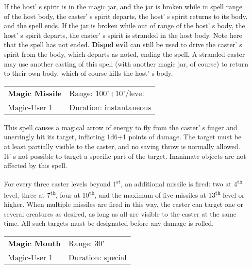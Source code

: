 \documentclass[a4paper,twoside,openany,10pt]{book}
\begin{document}
\begin{multicols}{2}
If the host' s spirit is in the magic jar, and the jar is broken while in spell range of the host body, the caster' s spirit departs, the host' s spirit returns to its body, and the spell ends. If the jar is broken while out of range of the host' s body, the host' s spirit departs, the caster' s spirit is stranded in the host body. Note here that the spell has not ended. \textbf{Dispel evil} can still be used to drive the caster' s spirit from the body, which departs as noted, ending the spell. A stranded caster may use another casting of this spell (with another magic jar, of course) to return to their own body, which of course kills the host' s body.

\smallskip\begin{flushleft} 
	\begin{tabularx}{0.45\textwidth}{@{}m{3.5cm}m{5.5cm}@{}} 
		\textbf{Magic Missile} & Range: 100'+10'/level\\
Magic-User 1 & Duration: instantaneous\\
	\end{tabularx}\end{flushleft}

This spell causes a magical arrow of energy to fly from the caster' s finger and unerringly hit its target, inflicting 1d6+1 points of damage. The target must be at least partially visible to the caster, and no saving throw is normally allowed. It' s not possible to target a specific part of the target. Inanimate objects are not affected by this spell.

For every three caster levels beyond 1\textsuperscript{st}, an additional missile is fired: two at 4\textsuperscript{th} level, three at 7\textsuperscript{th}, four at 10\textsuperscript{th}, and the maximum of five missiles at 13\textsuperscript{th} level or higher. When multiple missiles are fired in this way, the caster can target one or several creatures as desired, as long as all are visible to the caster at the same time. All such targets must be designated before any damage is rolled.

\smallskip\begin{flushleft} 
	\begin{tabularx}{0.45\textwidth}{@{}m{3.5cm}m{5.5cm}@{}} 
		\textbf{Magic Mouth} & Range: 30'\\
Magic-User 1 & Duration: special\\
	\end{tabularx}\end{flushleft}


\end{multicols}
\end{document}
